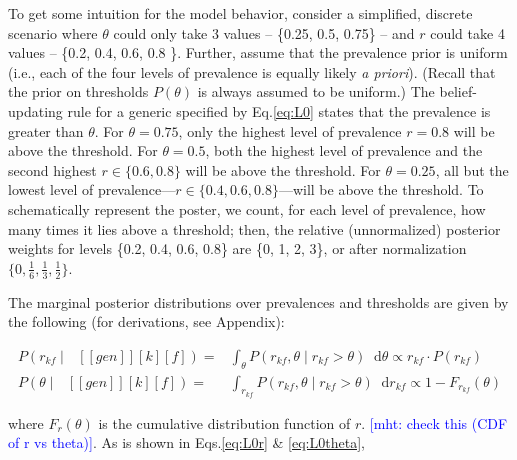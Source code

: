 \documentclass[floatsintext,doc]{apa6}
\newcommand{\denote}[1]{\mbox{ $[\![ #1 ]\!]$}}
\newcommand*\diff{\mathop{}\!\mathrm{d}}
\newcommand{\mht}[1]{{\textcolor{Blue}{[mht: #1]}}}
\begin{document}
To get some intuition for the model behavior, consider a simplified, discrete scenario where $\theta$ could only take 3 values -- \{0.25, 0.5, 0.75\} -- and $r$ could take 4 values -- \{0.2, 0.4, 0.6, 0.8 \}. Further, assume that the prevalence prior is uniform (i.e., each of the four levels of prevalence is equally likely \emph{a priori}). (Recall that the prior on thresholds $P(\theta)$ is always assumed to be uniform.)
The belief-updating rule for a generic specified by Eq.\ref{eq:L0} states that the prevalence is greater than $\theta$.
For $\theta = 0.75$, only the highest level of prevalence $r = 0.8$ will be above the threshold.  
For $\theta = 0.5$, both the highest level of prevalence and the second highest $r \in \{0.6, 0.8\}$ will be above the threshold.  
For $\theta = 0.25$, all but the lowest level of prevalence---$r \in \{0.4, 0.6, 0.8\}$---will be above the threshold.  
To schematically represent the poster, we count, for each level of prevalence, how many times it lies above a threshold; then, the relative (unnormalized) posterior weights for levels \{0.2, 0.4, 0.6, 0.8\} are \{0, 1, 2, 3\}, or after normalization  $\{0, \frac{1}{6}, \frac{1}{3}, \frac{1}{2}\}$.






The marginal posterior distributions over prevalences and thresholds are given by the following (for derivations, see Appendix):

\begin{align}
P(r_{kf} \mid \denote{gen}[k][f]) = &\int_{\theta}P (r_{kf}, \theta \mid r_{kf} >  \theta)\diff \theta \propto r_{kf} \cdot P(r_{kf}) \label {eq:L0r} \\
P(\theta \mid \denote{gen}[k][f]) = &\int_{r_{kf}}P (r_{kf}, \theta \mid r_{kf} >  \theta)\diff r_{kf}  \propto 1 - F_{r_{kf}}(\theta) \label {eq:L0theta}
\end{align}

where $F_r(\theta)$ is the cumulative distribution function of $r$. \mht{check this (CDF of r vs theta)}. As is shown in Eqs.\ref{eq:L0r} \& \ref{eq:L0theta}, 

\end{document}
